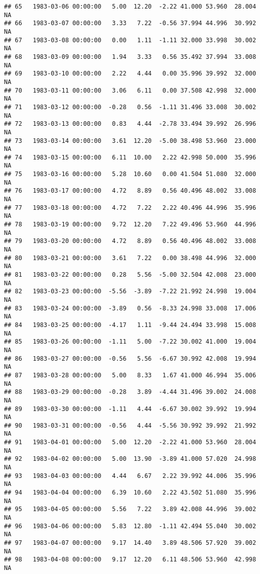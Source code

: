 \documentclass{article}\usepackage{graphicx, color}
\makeatletter
\newenvironment{kframe}{%
 \def\at@end@of@kframe{}%
 \ifinner\ifhmode%
  \def\at@end@of@kframe{\end{minipage}}%
  \begin{minipage}{\columnwidth}%
 \fi\fi%
 \def\FrameCommand##1{\hskip\@totalleftmargin \hskip-\fboxsep
 \colorbox{shadecolor}{##1}\hskip-\fboxsep
     \hskip-\linewidth \hskip-\@totalleftmargin \hskip\columnwidth}%
 \MakeFramed {\advance\hsize-\width
   \@totalleftmargin\z@ \linewidth\hsize
   \@setminipage}}%
 {\par\unskip\endMakeFramed%
 \at@end@of@kframe}
\newenvironment{knitrout}{}{} %
\makeatother
\begin{document}
\begin{knitrout}
\begin{kframe}
\begin{verbatim}
## 65   1983-03-06 00:00:00   5.00  12.20  -2.22 41.000 53.960  28.004     NA
## 66   1983-03-07 00:00:00   3.33   7.22  -0.56 37.994 44.996  30.992     NA
## 67   1983-03-08 00:00:00   0.00   1.11  -1.11 32.000 33.998  30.002     NA
## 68   1983-03-09 00:00:00   1.94   3.33   0.56 35.492 37.994  33.008     NA
## 69   1983-03-10 00:00:00   2.22   4.44   0.00 35.996 39.992  32.000     NA
## 70   1983-03-11 00:00:00   3.06   6.11   0.00 37.508 42.998  32.000     NA
## 71   1983-03-12 00:00:00  -0.28   0.56  -1.11 31.496 33.008  30.002     NA
## 72   1983-03-13 00:00:00   0.83   4.44  -2.78 33.494 39.992  26.996     NA
## 73   1983-03-14 00:00:00   3.61  12.20  -5.00 38.498 53.960  23.000     NA
## 74   1983-03-15 00:00:00   6.11  10.00   2.22 42.998 50.000  35.996     NA
## 75   1983-03-16 00:00:00   5.28  10.60   0.00 41.504 51.080  32.000     NA
## 76   1983-03-17 00:00:00   4.72   8.89   0.56 40.496 48.002  33.008     NA
## 77   1983-03-18 00:00:00   4.72   7.22   2.22 40.496 44.996  35.996     NA
## 78   1983-03-19 00:00:00   9.72  12.20   7.22 49.496 53.960  44.996     NA
## 79   1983-03-20 00:00:00   4.72   8.89   0.56 40.496 48.002  33.008     NA
## 80   1983-03-21 00:00:00   3.61   7.22   0.00 38.498 44.996  32.000     NA
## 81   1983-03-22 00:00:00   0.28   5.56  -5.00 32.504 42.008  23.000     NA
## 82   1983-03-23 00:00:00  -5.56  -3.89  -7.22 21.992 24.998  19.004     NA
## 83   1983-03-24 00:00:00  -3.89   0.56  -8.33 24.998 33.008  17.006     NA
## 84   1983-03-25 00:00:00  -4.17   1.11  -9.44 24.494 33.998  15.008     NA
## 85   1983-03-26 00:00:00  -1.11   5.00  -7.22 30.002 41.000  19.004     NA
## 86   1983-03-27 00:00:00  -0.56   5.56  -6.67 30.992 42.008  19.994     NA
## 87   1983-03-28 00:00:00   5.00   8.33   1.67 41.000 46.994  35.006     NA
## 88   1983-03-29 00:00:00  -0.28   3.89  -4.44 31.496 39.002  24.008     NA
## 89   1983-03-30 00:00:00  -1.11   4.44  -6.67 30.002 39.992  19.994     NA
## 90   1983-03-31 00:00:00  -0.56   4.44  -5.56 30.992 39.992  21.992     NA
## 91   1983-04-01 00:00:00   5.00  12.20  -2.22 41.000 53.960  28.004     NA
## 92   1983-04-02 00:00:00   5.00  13.90  -3.89 41.000 57.020  24.998     NA
## 93   1983-04-03 00:00:00   4.44   6.67   2.22 39.992 44.006  35.996     NA
## 94   1983-04-04 00:00:00   6.39  10.60   2.22 43.502 51.080  35.996     NA
## 95   1983-04-05 00:00:00   5.56   7.22   3.89 42.008 44.996  39.002     NA
## 96   1983-04-06 00:00:00   5.83  12.80  -1.11 42.494 55.040  30.002     NA
## 97   1983-04-07 00:00:00   9.17  14.40   3.89 48.506 57.920  39.002     NA
## 98   1983-04-08 00:00:00   9.17  12.20   6.11 48.506 53.960  42.998     NA

\end{verbatim}
\end{kframe}
\end{knitrout}
\end{document}
